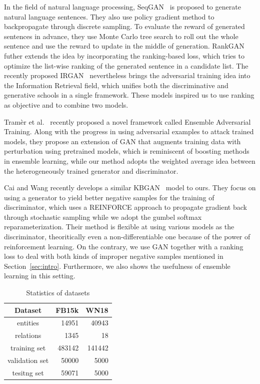 \documentclass[twocolumn,a4paper,10pt,preprint,3p]{elsarticle}
\begin{document}
In the field of natural language processing, SeqGAN~\cite{SeqGAN} is proposed to generate natural language sentences. They also use policy gradient method to backpropagate through discrete sampling. To evaluate the reward of generated sentences in advance, they use Monte Carlo tree search to roll out the whole sentence and use the reward to update in the middle of generation. RankGAN~\cite{RankGAN} futher extends the idea by incorporating the ranking-based loss, which tries to optimize the list-wise ranking of the generated sentence in a candidate list. The recently proposed IRGAN~\cite{IRGAN} nevertheless brings the adversarial training idea into the Information Retrieval field, which unifies both the discriminative and generative schools in a single framework. These models inspired us to use ranking as objective and to combine two models.

Tram\`er et al.~\cite{EnsembleAdvTraining} recently proposed a novel framework called Ensemble Adversarial Training. Along with the progress in using adversarial examples to attack trained models, they propose an extension of GAN that augments training data with perturbation using pretrained models, which is reminiscent of boosting methods in ensemble learning, while our method adopts the weighted average idea between the heterogeneously trained generator and discriminator.

Cai and Wang recently develops a similar KBGAN~\cite{Cai2017KBGAN} model to ours. They focus on using a generator to yield better negative samples for the training of discriminator, which uses a REINFORCE approach to propagate gradient back through stochastic sampling while we adopt the gumbel softmax reparameterization. Their method is flexible at using various models as the discriminator, theoritically even a non-differentiable one because of the power of reinforcement learning. On the contrary, we use GAN together with a ranking loss to deal with both kinds of improper negative samples mentioned in Section~\ref{sec:intro}. Furthermore, we also shows the usefulness of ensemble learning in this setting.



\begin{table}[hbtp]
    \centering
    \begin{tabular}{crr}
        \toprule
        Dataset & FB15k & WN18 \\
        \midrule
        entities &  14951   &  40943  \\
        relations &  1345   & 18 \\
        training set &  483142   & 141442 \\
        validation set &  50000   & 5000 \\
        tesitng set &  59071  & 5000 \\
        \bottomrule
    \end{tabular}
    \caption{Statistics of datasets}
\label{datasets}
\end{table}
\end{document}
